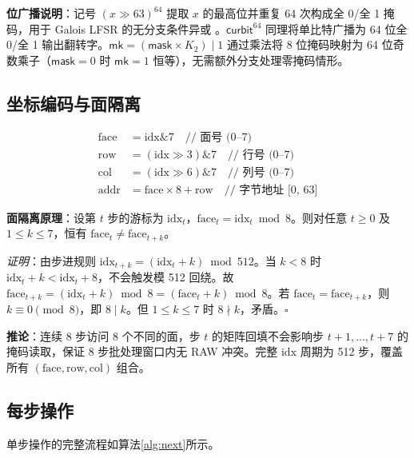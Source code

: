 \documentclass[11pt,a4paper]{ctexart}
\begin{document}
\textbf{位广播说明}：记号 $(x \gg 63)^{64}$ 提取 $x$ 的最高位并重复 64 次构成全 0/全 1 掩码，用于 Galois LFSR 的无分支条件异或 \cite{chacha}。$\mathsf{curbit}^{64}$ 同理将单比特广播为 64 位全 0/全 1 输出翻转字。$\mathsf{mk} = (\mathsf{mask} \times K_2) \mid 1$ 通过乘法将 8 位掩码映射为 64 位奇数乘子（$\mathsf{mask}=0$ 时 $\mathsf{mk}=1$ 恒等），无需额外分支处理零掩码情形。

\subsection{坐标编码与面隔离}

\begin{equation}
\begin{aligned}
\mathrm{face} &= \mathrm{idx} \mathbin{\&} 7 \quad \text{// 面号 (0--7)} \\
\mathrm{row}  &= (\mathrm{idx} \gg 3) \mathbin{\&} 7 \quad \text{// 行号 (0--7)} \\
\mathrm{col}  &= (\mathrm{idx} \gg 6) \mathbin{\&} 7 \quad \text{// 列号 (0--7)} \\
\mathrm{addr} &= \mathrm{face} \times 8 + \mathrm{row} \quad \text{// 字节地址 [0, 63]}
\end{aligned}
\end{equation}

\textbf{面隔离原理}：设第 $t$ 步的游标为 $\mathrm{idx}_t$，$\mathrm{face}_t = \mathrm{idx}_t \bmod 8$。则对任意 $t \ge 0$ 及 $1 \le k \le 7$，恒有 $\mathrm{face}_t \neq \mathrm{face}_{t+k}$。

\textit{证明}：由步进规则 $\mathrm{idx}_{t+k} = (\mathrm{idx}_t + k) \bmod 512$。当 $k < 8$ 时 $\mathrm{idx}_t + k < \mathrm{idx}_t + 8$，不会触发模 512 回绕。故 $\mathrm{face}_{t+k} = (\mathrm{idx}_t + k) \bmod 8 = (\mathrm{face}_t + k) \bmod 8$。若 $\mathrm{face}_t = \mathrm{face}_{t+k}$，则 $k \equiv 0 \pmod 8$，即 $8 \mid k$。但 $1 \le k \le 7$ 时 $8 \nmid k$，矛盾。$\square$

\textbf{推论}：连续 8 步访问 8 个不同的面，步 $t$ 的矩阵回填不会影响步 $t+1,\dots,t+7$ 的掩码读取，保证 8 步批处理窗口内无 RAW 冲突。完整 $\mathrm{idx}$ 周期为 512 步，覆盖所有 $(\mathrm{face}, \mathrm{row}, \mathrm{col})$ 组合。

\clearpage
\subsection{每步操作}

单步操作的完整流程如算法\ref{alg:next}所示。
\end{document}
